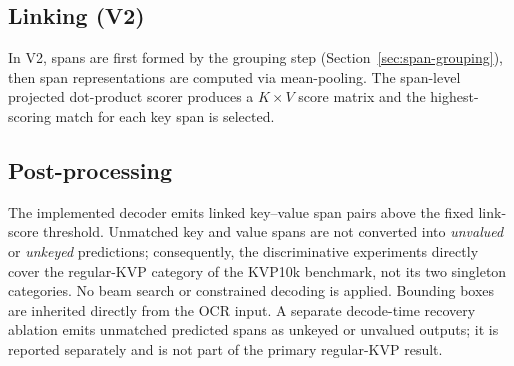 \subsection{Linking (V2)}
\label{sec:v2-linking-inference}

In V2, spans are first formed by the grouping step
(Section~\ref{sec:span-grouping}), then span representations are computed via
mean-pooling. The span-level projected dot-product scorer produces a $K \times V$ score
matrix and the highest-scoring match for each key span is selected.

\subsection{Post-processing}
\label{sec:post-processing}

The implemented decoder emits linked key--value span pairs above the fixed
link-score threshold. Unmatched key and value spans are not converted into
\emph{unvalued} or \emph{unkeyed} predictions; consequently, the discriminative
experiments directly cover the regular-KVP category of the KVP10k benchmark,
not its two singleton categories. No beam search or constrained decoding is
applied. Bounding boxes are inherited directly from the OCR input. A separate
decode-time recovery ablation emits unmatched predicted spans as unkeyed or
unvalued outputs; it is reported separately and is not part of the primary
regular-KVP result.
